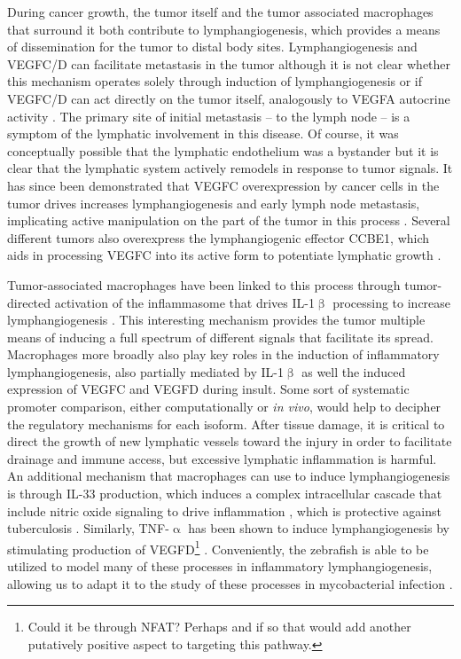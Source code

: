 During cancer growth, the tumor itself and the tumor associated macrophages that surround it both contribute to lymphangiogenesis, which provides a means of dissemination for the tumor to distal body sites. Lymphangiogenesis and VEGFC/D can facilitate metastasis in the tumor although it is not clear whether this mechanism operates solely through induction of lymphangiogenesis or if VEGFC/D can act directly on the tumor itself, analogously to VEGFA autocrine activity \citep{Stacker2014}. The primary site of initial metastasis -- to the lymph node -- is a symptom of the lymphatic involvement in this disease. Of course, it was conceptually possible that the lymphatic endothelium was a bystander but it is clear that the lymphatic system actively remodels in response to tumor signals. It has since been demonstrated that VEGFC overexpression by cancer cells in the tumor drives increases lymphangiogenesis and early lymph node metastasis, implicating active manipulation on the part of the tumor in this process \citep{Duong2012}. Several different tumors also overexpress the lymphangiogenic effector CCBE1, which aids in processing VEGFC into its active form to potentiate lymphatic growth \citep{Hogan2009, LeGuen2014, Li2018b, Song2020, Zhao2018}.

Tumor\hyp{}associated macrophages have been linked to this process through tumor\hyp{}directed activation of the inflammasome that drives IL\hyp{}1$\upbeta$ processing to increase lymphangiogenesis \citep{Weichand2017}. This interesting mechanism provides the tumor multiple means of inducing a full spectrum of different signals that facilitate its spread. Macrophages more broadly also play key roles in the induction of inflammatory lymphangiogenesis, also partially mediated by IL\hyp{}1$\upbeta$ as well the induced expression of VEGFC and VEGFD during insult. Some sort of systematic promoter comparison, either computationally or \textit{in vivo}, would help to decipher the regulatory mechanisms for each isoform. After tissue damage, it is critical to direct the growth of new lymphatic vessels toward the injury in order to facilitate drainage and immune access, but excessive lymphatic inflammation is harmful. An additional mechanism that macrophages can use to induce lymphangiogenesis is through IL\hyp{}33 production, which induces a complex intracellular cascade that include nitric oxide signaling to drive inflammation \citep{Han2017}, which is protective against tuberculosis \citep{Villarreal2015, Pineros2017}. Similarly, TNF\hyp{}$\upalpha$ has been shown to induce lymphangiogenesis by stimulating production of VEGFD\footnote{Could it be through NFAT? Perhaps and if so that would add another putatively positive aspect to targeting this pathway.} \citep{Hong2016}. Conveniently, the zebrafish is able to be utilized to model many of these processes in inflammatory lymphangiogenesis, allowing us to adapt it to the study of these processes in mycobacterial infection \citep{Okuda2015}.

